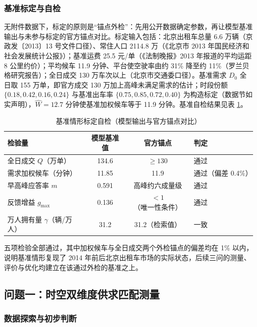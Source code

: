 \documentclass[12pt,a4paper]{ctexart}
\begin{document}
\subsubsection{基准标定与自检}

无附件数据下，标定的原则是“锚点外检”：先用公开数据确定参数，再让模型基准输出与未参与标定的官方锚点对比。标定输入包括：北京出租车总量 6.6 万辆（京政发〔2013〕13 号文件口径）、常住人口 2114.8 万（《北京市 2013 年国民经济和社会发展统计公报》）；基准运费 25.5 元/单（《法制晚报》2013 年报道的平均运距 8 公里约价）；平均候车 11.9 分钟、平台使空驶率由约 31\% 降至约 11\%（罗兰贝格研究报告）；全日成交 130 万车次以上（北京市交通委口径）。基准需求 $D_0$ 全日取 155 万单，即官方成交 130 万加上高峰未满足需求的估计；时段份额 $\{0.18, 0.42, 0.16, 0.24\}$ 与基准出车率 $\{0.75, 0.85, 0.72, 0.40\}$ 为构造标定（数据节如实声明），$\hat{W}=12.7$ 分钟使基准加权候车等于 11.9 分钟。基准自检结果见表 \ref{tab:calib}。

\begin{table}[H]
\centering
\caption{基准情形标定自检（模型输出与官方锚点对比）}
\label{tab:calib}
\begin{tabular}{l c c l}
\toprule
检验量 & 模型基准值 & 官方锚点 & 判定 \\
\midrule
全日成交 $Q$（万单） & 134.6 & $\ge 130$ & 通过 \\
需求加权候车（分钟） & 11.85 & 11.9 & 通过（偏差 0.4\%） \\
早高峰应答率 $m$ & 0.591 & 高峰约六成量级 & 通过 \\
反馈增益 $g_{\max}$ & 0.136 & $<1$（唯一性条件） & 通过 \\
万人拥有量 $\gamma$（辆/万人） & 31.2 & 31.2（检索值） & 一致 \\
\bottomrule
\end{tabular}
\end{table}

五项检验全部通过，其中加权候车与全日成交两个外检锚点的偏差均在 1\% 以内，说明基准情形复现了 2014 年前后北京出租车市场的实际状态，后续三问的测量、评价与优化均建立在该通过外检的基准之上。

\subsection{问题一：时空双维度供求匹配测量}

\subsubsection{数据探索与初步判断}
\end{document}
